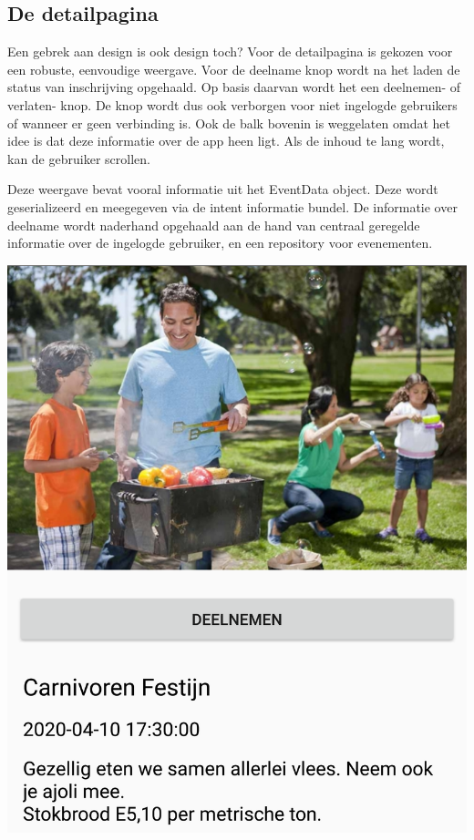 \documentclass[dutch]{report}
\begin{document}
	\subsection{De detailpagina}
	\begin{minipage}{0.60\textwidth}
	Een gebrek aan design is ook design toch? Voor de detailpagina is gekozen voor een robuste, eenvoudige
	weergave. Voor de deelname knop wordt na het laden de status van inschrijving opgehaald. Op basis daarvan
	wordt het een deelnemen- of verlaten- knop. De knop wordt dus ook verborgen voor niet ingelogde gebruikers
	of wanneer er geen verbinding is. Ook de balk bovenin is weggelaten omdat het idee is dat deze informatie
	over de app heen ligt. Als de inhoud te lang wordt, kan de gebruiker scrollen. 
	
	Deze weergave bevat vooral informatie uit het EventData object. Deze wordt geserializeerd en meegegeven 
	via de intent informatie bundel. De informatie over deelname wordt naderhand opgehaald aan de hand van 
	centraal geregelde informatie over de ingelogde gebruiker, en een repository voor evenementen. 

	
	\end{minipage}
	\hfill
	\begin{minipage}{0.35\textwidth}
		\includegraphics[width=\linewidth]{images/detailview.png}
	\end{minipage}
	
\end{document}
